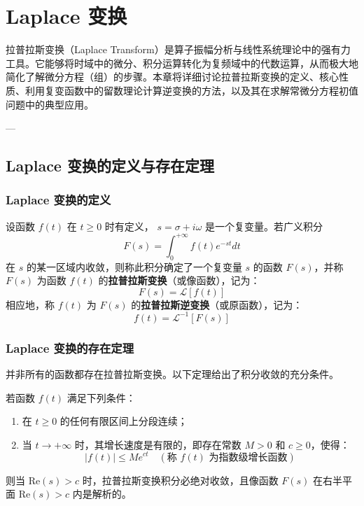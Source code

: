 \chapter{Laplace 变换}

拉普拉斯变换（Laplace Transform）是算子振幅分析与线性系统理论中的强有力工具。它能够将时域中的微分、积分运算转化为复频域中的代数运算，从而极大地简化了解微分方程（组）的步骤。本章将详细讨论拉普拉斯变换的定义、核心性质、利用复变函数中的留数理论计算逆变换的方法，以及其在求解常微分方程初值问题中的典型应用。

---

\section{Laplace 变换的定义与存在定理}

\subsection{Laplace 变换的定义}
\begin{tcolorbox}[colback=blue!5!white, colframe=blue!75!black, title=定义 \thechapter.1 \quad Laplace 变换]
	设函数 $f(t)$ 在 $t \ge 0$ 时有定义， $s = \sigma + i\omega$ 是一个复变量。若广义积分
	$$ F(s) = \int_{0}^{+\infty} f(t) e^{-st} dt $$
	在 $s$ 的某一区域内收敛，则称此积分确定了一个复变量 $s$ 的函数 $F(s)$，并称 $F(s)$ 为函数 $f(t)$ 的\textbf{拉普拉斯变换}（或像函数），记为：
	$$ F(s) = \mathcal{L}[f(t)] $$
	相应地，称 $f(t)$ 为 $F(s)$ 的\textbf{拉普拉斯逆变换}（或原函数），记为：
	$$ f(t) = \mathcal{L}^{-1}[F(s)] $$
\end{tcolorbox}

\subsection{Laplace 变换的存在定理}
并非所有的函数都存在拉普拉斯变换。以下定理给出了积分收敛的充分条件。
\begin{tcolorbox}[colback=teal!5!white, colframe=teal!75!black, title=定理 \thechapter.1 \quad 存在定理]
	若函数 $f(t)$ 满足下列条件：
	\begin{enumerate}
		\item 在 $t \ge 0$ 的任何有限区间上分段连续；
		\item 当 $t \to +\infty$ 时，其增长速度是有限的，即存在常数 $M > 0$ 和 $c \ge 0$，使得：
		$$ |f(t)| \le M e^{ct} \quad (\text{称 } f(t) \text{ 为指数级增长函数}) $$
	\end{enumerate}
	则当 $\text{Re}(s) > c$ 时，拉普拉斯变换积分必绝对收敛，且像函数 $F(s)$ 在右半平面 $\text{Re}(s) > c$ 内是解析的。
\end{tcolorbox}

